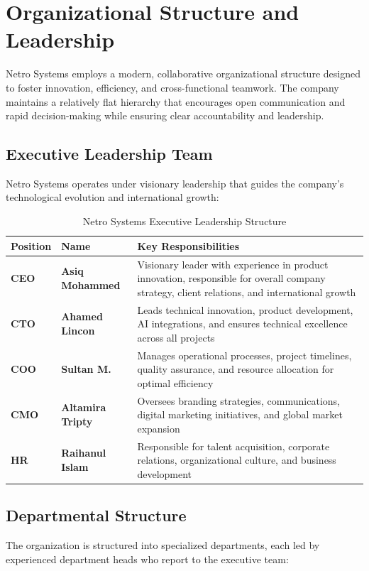 \documentclass[12pt,a4paper]{report}
\newcommand{\tableheaderrow}{\rowcolor{tableheader}}
\newcommand{\tablealtrow}{\rowcolor{tablealt1}}
\newcommand{\impact}[1]{\textcolor{impactcolor}{\textbf{#1}}}
\begin{document}
\newpage
\section{Organizational Structure and Leadership}
Netro Systems employs a modern, collaborative organizational structure designed to foster innovation, efficiency, and cross-functional teamwork. The company maintains a relatively flat hierarchy that encourages open communication and rapid decision-making while ensuring clear accountability and leadership.

\subsection{Executive Leadership Team}
Netro Systems operates under visionary leadership that guides the company's technological evolution and international growth:

\begin{table}[h!]
\centering
\caption{Netro Systems Executive Leadership Structure}
\label{tab:leadership}
\begin{tabular}{p{3cm} p{3.5cm} p{7.5cm}}
\toprule
\tableheaderrow \textcolor{headertext}{\textbf{Position}} & \textcolor{headertext}{\textbf{Name}} & \textcolor{headertext}{\textbf{Key Responsibilities}} \\
\midrule
\tablealtrow \impact{CEO} & \textbf{Asiq Mohammed} & Visionary leader with experience in product innovation, responsible for overall company strategy, client relations, and international growth \\
\impact{CTO} & \textbf{Ahamed Lincon} & Leads technical innovation, product development, AI integrations, and ensures technical excellence across all projects \\
\tablealtrow \impact{COO} & \textbf{Sultan M.} & Manages operational processes, project timelines, quality assurance, and resource allocation for optimal efficiency \\
\impact{CMO} & \textbf{Altamira Tripty} & Oversees branding strategies, communications, digital marketing initiatives, and global market expansion \\
\tablealtrow \impact{HR} & \textbf{Raihanul Islam} & Responsible for talent acquisition, corporate relations, organizational culture, and business development \\
\bottomrule
\end{tabular}
\end{table}

\newpage
\subsection{Departmental Structure}
The organization is structured into specialized departments, each led by experienced department heads who report to the executive team:
\end{document}
